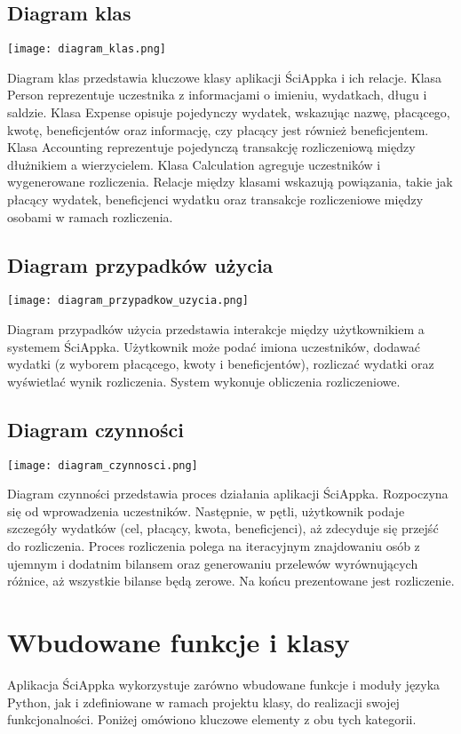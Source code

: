 \documentclass{article}
\begin{document}
\subsection{Diagram klas}
\begin{center}
	\texttt{[image: diagram\_klas.png]}
\end{center}
Diagram klas przedstawia kluczowe klasy aplikacji ŚciAppka i ich relacje. Klasa Person reprezentuje uczestnika z informacjami o imieniu, wydatkach, długu i saldzie. Klasa Expense opisuje pojedynczy wydatek, wskazując nazwę, płacącego, kwotę, beneficjentów oraz informację, czy płacący jest również beneficjentem. Klasa Accounting reprezentuje pojedynczą transakcję rozliczeniową między dłużnikiem a wierzycielem. Klasa Calculation agreguje uczestników i wygenerowane rozliczenia. Relacje między klasami wskazują powiązania, takie jak płacący wydatek, beneficjenci wydatku oraz transakcje rozliczeniowe między osobami w ramach rozliczenia.
\subsection{Diagram przypadków użycia}
\begin{center}
	\texttt{[image: diagram\_przypadkow\_uzycia.png]}
\end{center}
Diagram przypadków użycia przedstawia interakcje między użytkownikiem a systemem ŚciAppka. Użytkownik może podać imiona uczestników, dodawać wydatki (z wyborem płacącego, kwoty i beneficjentów), rozliczać wydatki oraz wyświetlać wynik rozliczenia. System wykonuje obliczenia rozliczeniowe.
\subsection{Diagram czynności}
\begin{center}
	\texttt{[image: diagram\_czynnosci.png]}
\end{center}
Diagram czynności przedstawia proces działania aplikacji ŚciAppka. Rozpoczyna się od wprowadzenia uczestników. Następnie, w pętli, użytkownik podaje szczegóły wydatków (cel, płacący, kwota, beneficjenci), aż zdecyduje się przejść do rozliczenia. Proces rozliczenia polega na iteracyjnym znajdowaniu osób z ujemnym i dodatnim bilansem oraz generowaniu przelewów wyrównujących różnice, aż wszystkie bilanse będą zerowe. Na końcu prezentowane jest rozliczenie.
	
\section{Wbudowane funkcje i klasy}
Aplikacja ŚciAppka wykorzystuje zarówno wbudowane funkcje i moduły języka Python, jak i zdefiniowane w ramach projektu klasy, do realizacji swojej funkcjonalności. Poniżej omówiono kluczowe elementy z obu tych kategorii.
\end{document}
